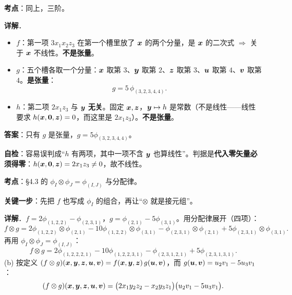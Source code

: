 \documentclass[11pt]{ctexart}
\renewcommand{\qbreak}{\needspace{0.22\textheight}}
\begin{document}
\qbreak
{}\label{ax5}
\qbreak
{}

\textbf{考点}：同上，三阶。

\textbf{详解}．
\begin{itemize}
  \item $f$：第一项 $3x_1x_2z_3$ 在第一个槽里放了 $\boldsymbol{x}$ 的两个分量，是 $\boldsymbol{x}$ 的二次式 $\Rightarrow$ 关于 $\boldsymbol{x}$ 不线性。\textbf{不是张量}。
  \item $g$：五个槽各取一个分量：$\boldsymbol{x}$ 取第 $3$、$\boldsymbol{y}$ 取第 $2$、$\boldsymbol{z}$ 取第 $3$、$\boldsymbol{u}$ 取第 $4$、$\boldsymbol{v}$ 取第 $4$。\textbf{是张量}：
  \[ g=5\,\phi_{(3,2,3,4,4)}. \]
  \item $h$：第二项 $2x_1z_3$ 与 $\boldsymbol{y}$ \textbf{无关}。固定 $\boldsymbol{x},\boldsymbol{z}$，$\boldsymbol{y}\mapsto h$ 是常数（不是线性——线性要求 $h(\boldsymbol{x},\boldsymbol{0},\boldsymbol{z})=0$，而这里是 $2x_1z_3$）。\textbf{不是张量}。
\end{itemize}

\textbf{答案}：只有 $g$ 是张量，$g=5\phi_{(3,2,3,4,4)}$。

\textbf{自检}：容易误判成“$h$ 有两项，其中一项不含 $\boldsymbol{y}$ 也算线性”。判据是\textbf{代入零矢量必须得零}：$h(\boldsymbol{x},\boldsymbol{0},\boldsymbol{z})=2x_1z_3\ne0$，故不线性。

\qbreak
{}\label{ax6}
\qbreak
{}

\textbf{考点}：§4.3 的 $\phi_I\otimes\phi_J=\phi_{(I,J)}$ 与分配律。

\textbf{关键一步}：先把 $f$ 也写成 $\phi_I$ 的组合，再让“$\otimes$ 就是接元组”。

\textbf{详解}．$f=2\phi_{(1,2,2)}-\phi_{(2,3,1)}$，$g=\phi_{(2,1)}-5\phi_{(3,1)}$。用分配律展开（四项）：
\[ f\otimes g=2\phi_{(1,2,2)}\otimes\phi_{(2,1)}-10\phi_{(1,2,2)}\otimes\phi_{(3,1)}
-\phi_{(2,3,1)}\otimes\phi_{(2,1)}+5\phi_{(2,3,1)}\otimes\phi_{(3,1)}. \]
再用 $\phi_I\otimes\phi_J=\phi_{(I,J)}$：
\[ f\otimes g=2\phi_{(1,2,2,2,1)}-10\phi_{(1,2,2,3,1)}-\phi_{(2,3,1,2,1)}+5\phi_{(2,3,1,3,1)}. \]
(b) 按定义 $(f\otimes g)(\boldsymbol{x},\boldsymbol{y},\boldsymbol{z},\boldsymbol{u},\boldsymbol{v})=f(\boldsymbol{x},\boldsymbol{y},\boldsymbol{z})\,g(\boldsymbol{u},\boldsymbol{v})$，而 $g(\boldsymbol{u},\boldsymbol{v})=u_2v_1-5u_3v_1$：
\[ (f\otimes g)(\boldsymbol{x},\boldsymbol{y},\boldsymbol{z},\boldsymbol{u},\boldsymbol{v})=\bigl(2x_1y_2z_2-x_2y_3z_1\bigr)\bigl(u_2v_1-5u_3v_1\bigr). \]
\end{document}
